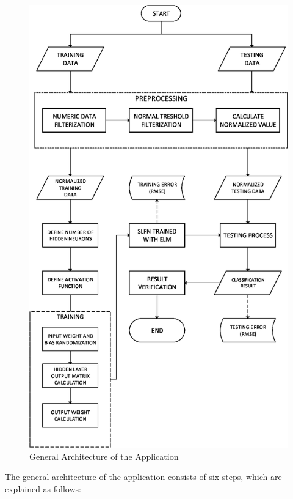 \documentclass[journal,comsoc]{IEEEtran}
\let\MYoriglatexcaption\caption
\renewcommand{\caption}[2][\relax]{\MYoriglatexcaption[#2]{#2}}
\begin{document}
\begin{figure}[!th]
\centering
\includegraphics[scale=0.4]{ArsitekturUmum-Redesigned.eps}
\caption{General Architecture of the Application}
\label{fig2}
\end{figure}

The general architecture of the application consists of six steps, which are explained as follows:
\end{document}
